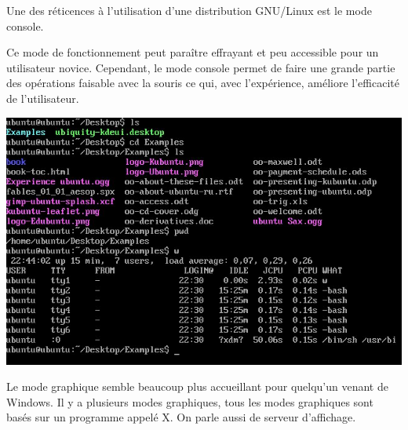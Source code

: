 \documentclass[11pt,oneside]{article}
\begin{document}
\begin{minipage}[c]{.49\linewidth}
Une des réticences à l'utilisation d'une distribution GNU/Linux est le mode console. 

Ce mode de fonctionnement peut paraître effrayant et peu accessible pour un utilisateur novice. Cependant, le mode console permet de faire une grande partie des opérations faisable avec la souris ce qui, avec l'expérience, améliore l'efficacité de l'utilisateur.
\end{minipage} \hfill
\begin{minipage}[c]{.49\linewidth}
\begin{center}
\includegraphics[width=.9\textwidth]{images/commande.jpg}
\end{center}
\end{minipage}
%
%


\vspace{.25cm}

Le mode graphique semble beaucoup plus accueillant pour quelqu'un venant de Windows. 
Il y a plusieurs modes graphiques, tous les modes graphiques sont basés sur un programme appelé X. On parle aussi de serveur d'affichage.
\end{document}
